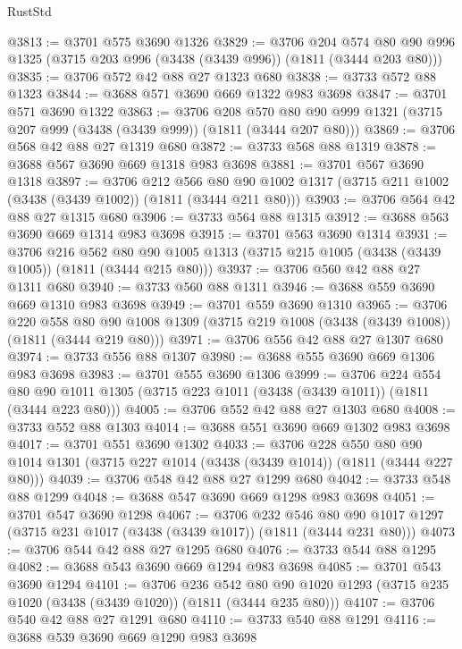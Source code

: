 \begin{lexlean}{RustStd}
\begin{coremodule}
@3813 := @3701 @575 @3690 @1326
@3829 := @3706
    @204
    @574
    @80
    @90
    @996
    @1325
    (@3715 @203 @996 (@3438 (@3439 @996)) (@1811 (@3444 @203 @80)))
@3835 := @3706 @572 @42 @88 @27 @1323 @680
@3838 := @3733 @572 @88 @1323
@3844 := @3688 @571 @3690 @669 @1322 @983 @3698
@3847 := @3701 @571 @3690 @1322
@3863 := @3706
    @208
    @570
    @80
    @90
    @999
    @1321
    (@3715 @207 @999 (@3438 (@3439 @999)) (@1811 (@3444 @207 @80)))
@3869 := @3706 @568 @42 @88 @27 @1319 @680
@3872 := @3733 @568 @88 @1319
@3878 := @3688 @567 @3690 @669 @1318 @983 @3698
@3881 := @3701 @567 @3690 @1318
@3897 := @3706
    @212
    @566
    @80
    @90
    @1002
    @1317
    (@3715 @211 @1002 (@3438 (@3439 @1002)) (@1811 (@3444 @211 @80)))
@3903 := @3706 @564 @42 @88 @27 @1315 @680
@3906 := @3733 @564 @88 @1315
@3912 := @3688 @563 @3690 @669 @1314 @983 @3698
@3915 := @3701 @563 @3690 @1314
@3931 := @3706
    @216
    @562
    @80
    @90
    @1005
    @1313
    (@3715 @215 @1005 (@3438 (@3439 @1005)) (@1811 (@3444 @215 @80)))
@3937 := @3706 @560 @42 @88 @27 @1311 @680
@3940 := @3733 @560 @88 @1311
@3946 := @3688 @559 @3690 @669 @1310 @983 @3698
@3949 := @3701 @559 @3690 @1310
@3965 := @3706
    @220
    @558
    @80
    @90
    @1008
    @1309
    (@3715 @219 @1008 (@3438 (@3439 @1008)) (@1811 (@3444 @219 @80)))
@3971 := @3706 @556 @42 @88 @27 @1307 @680
@3974 := @3733 @556 @88 @1307
@3980 := @3688 @555 @3690 @669 @1306 @983 @3698
@3983 := @3701 @555 @3690 @1306
@3999 := @3706
    @224
    @554
    @80
    @90
    @1011
    @1305
    (@3715 @223 @1011 (@3438 (@3439 @1011)) (@1811 (@3444 @223 @80)))
@4005 := @3706 @552 @42 @88 @27 @1303 @680
@4008 := @3733 @552 @88 @1303
@4014 := @3688 @551 @3690 @669 @1302 @983 @3698
@4017 := @3701 @551 @3690 @1302
@4033 := @3706
    @228
    @550
    @80
    @90
    @1014
    @1301
    (@3715 @227 @1014 (@3438 (@3439 @1014)) (@1811 (@3444 @227 @80)))
@4039 := @3706 @548 @42 @88 @27 @1299 @680
@4042 := @3733 @548 @88 @1299
@4048 := @3688 @547 @3690 @669 @1298 @983 @3698
@4051 := @3701 @547 @3690 @1298
@4067 := @3706
    @232
    @546
    @80
    @90
    @1017
    @1297
    (@3715 @231 @1017 (@3438 (@3439 @1017)) (@1811 (@3444 @231 @80)))
@4073 := @3706 @544 @42 @88 @27 @1295 @680
@4076 := @3733 @544 @88 @1295
@4082 := @3688 @543 @3690 @669 @1294 @983 @3698
@4085 := @3701 @543 @3690 @1294
@4101 := @3706
    @236
    @542
    @80
    @90
    @1020
    @1293
    (@3715 @235 @1020 (@3438 (@3439 @1020)) (@1811 (@3444 @235 @80)))
@4107 := @3706 @540 @42 @88 @27 @1291 @680
@4110 := @3733 @540 @88 @1291
@4116 := @3688 @539 @3690 @669 @1290 @983 @3698

\end{coremodule}
\end{lexlean}
